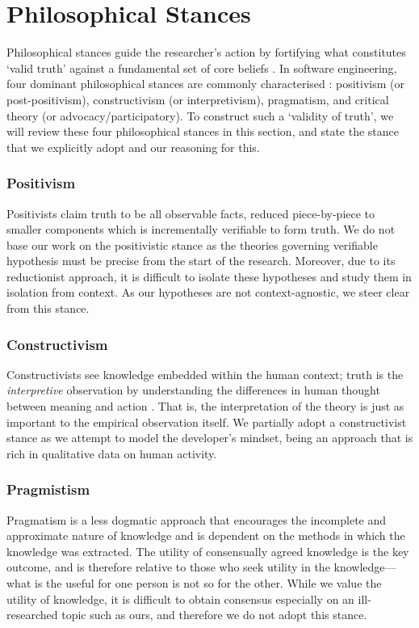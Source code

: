 \section{Philosophical Stances}
\label{sec:research-methodology:philosophical-stances}

Philosophical stances guide the researcher's action by fortifying what constitutes `valid truth' against a fundamental set of core beliefs \citep{Ritzer:1991ge}. In software engineering, four dominant philosophical stances are commonly characterised \citep{Creswell:2017vn,Petersen:2019ji}: positivism (or post-positivism), constructivism (or interpretivism), pragmatism, and critical theory (or advocacy/participatory). To construct such a `validity of truth', we will review these four philosophical stances in this section, and state the stance that we explicitly adopt and our reasoning for this.

\subsubsection{Positivism}
Positivists claim truth to be all observable facts, reduced piece-by-piece to smaller components which is incrementally verifiable to form truth. We do not base our work on the positivistic stance as the theories governing verifiable hypothesis must be precise from the start of the research. Moreover, due to its reductionist approach, it is difficult to isolate these hypotheses and study them in isolation from context.
As our hypotheses are not context-agnostic, we steer clear from this stance.

\subsubsection{Constructivism}
Constructivists see knowledge embedded within the human context; truth is the \textit{interpretive} observation by understanding the differences in human thought between meaning and action \citep{Klein:1999uv}. That is, the interpretation of the theory is just as important to the empirical observation itself.
We partially adopt a constructivist stance as we attempt to model the developer's mindset, being an approach that is rich in qualitative data on human activity.

\subsubsection{Pragmistism}
Pragmatism is a less dogmatic approach that encourages the incomplete and approximate nature of knowledge and is dependent on the methods in which the knowledge was extracted. The utility of consensually agreed knowledge is the key outcome, and is therefore relative to those who seek utility in the knowledge---what is the useful for one person is not so for the other. While we value the utility of knowledge, it is difficult to obtain consensus especially on an ill-researched topic such as ours, and therefore we do not adopt this stance.

